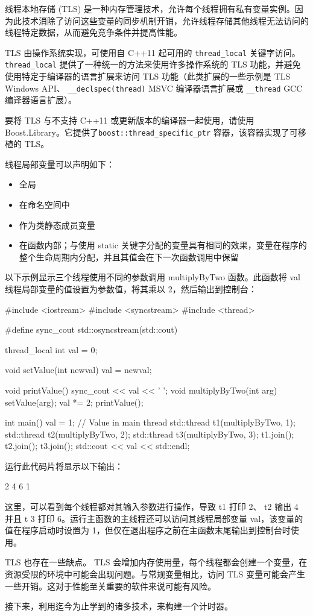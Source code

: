 
线程本地存储 (TLS) 是一种内存管理技术，允许每个线程拥有私有变量实例。因为此技术消除了访问这些变量的同步机制开销，允许线程存储其他线程无法访问的线程特定数据，从而避免竞争条件并提高性能。

TLS 由操作系统实现，可使用自 C++11 起可用的 \verb|thread_local| 关键字访问。 \verb|thread_local| 提供了一种统一的方法来使用许多操作系统的 TLS 功能，并避免使用特定于编译器的语言扩展来访问 TLS 功能（此类扩展的一些示例是 TLS Windows API、 \verb|__declspec(thread)| MSVC 编译器语言扩展或 \verb|__thread| GCC 编译器语言扩展）。

要将 TLS 与不支持 C++11 或更新版本的编译器一起使用，请使用 Boost.Library。它提供了\verb|boost::thread_specific_ptr| 容器，该容器实现了可移植的 TLS。

线程局部变量可以声明如下：

\begin{itemize}
\item
全局

\item
在命名空间中

\item
作为类静态成员变量

\item
在函数内部；与使用 static 关键字分配的变量具有相同的效果，变量在程序的整个生命周期内分配，并且其值会在下一次函数调用中保留
\end{itemize}

以下示例显示三个线程使用不同的参数调用 multiplyByTwo 函数。此函数将 val 线程局部变量的值设置为参数值，将其乘以 2，然后输出到控制台：

\begin{cpp}
#include <iostream>
#include <syncstream>
#include <thread>

#define sync_cout std::osyncstream(std::cout)

thread_local int val = 0;

void setValue(int newval) { val = newval; }

void printValue() { sync_cout << val << ' '; }
void multiplyByTwo(int arg) {
    setValue(arg);
    val *= 2;
    printValue();
}

int main() {
    val = 1; // Value in main thread
    std::thread t1(multiplyByTwo, 1);
    std::thread t2(multiplyByTwo, 2);
    std::thread t3(multiplyByTwo, 3);
    t1.join();
    t2.join();
    t3.join();
    std::cout << val << std::endl;
}
\end{cpp}

运行此代码片将显示以下输出：

\begin{shell}
2 4 6 1
\end{shell}

这里，可以看到每个线程都对其输入参数进行操作，导致 t1 打印 2、 t2 输出 4 并且 t 3 打印 6。运行主函数的主线程还可以访问其线程局部变量 val，该变量的值在程序启动时设置为 1，但仅在退出程序之前在主函数末尾输出到控制台时使用。

TLS 也存在一些缺点。 TLS 会增加内存使用量，每个线程都会创建一个变量，在资源受限的环境中可能会出现问题。与常规变量相比，访问 TLS 变量可能会产生一些开销。这对于性能至关重要的软件来说可能有风险。

接下来，利用迄今为止学到的诸多技术，来构建一个计时器。



